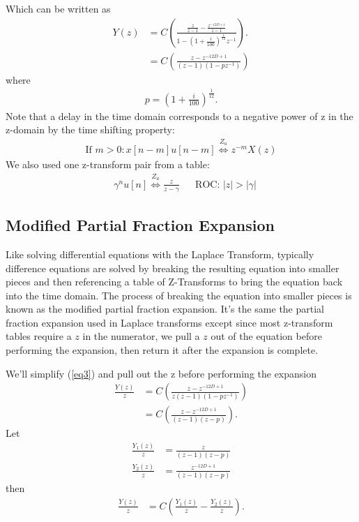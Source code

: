 \documentclass[letterpaper]{article}
\begin{document}
Which can be written as
\begin{align}
	Y(z) &=  C\left(\frac{\frac{z}{z-1} - \frac{z^{-12D+1}}{z-1}}
	{1 - \left(1 + \frac{i}{100} \right)^{\frac{1}{12}}z^{-1}}\right). \label{eq3} \\
	     &=  C\left(\frac{z - z^{-12D+1}}{(z-1)(1 - p z^{-1})}\right)
\end{align}
where 
\begin{align}
	p = \left(1 + \frac{i}{100} \right)^{\frac{1}{12}}.
\end{align}
Note that a delay in the time domain corresponds to a negative power of z in the z-domain by the time shifting property:
\begin{align}
	\text{If }m>0: x[n-m]u[n-m] \stackrel{Z_u}{\Longleftrightarrow} z^{-m} X(z)
\end{align}
We also used one z-transform pair from a table:
\begin{align}
	&\gamma^nu[n] \stackrel{Z_u}{\Longleftrightarrow} \frac{z}{z-\gamma} & &\text{ROC: } |z|>|\gamma| \label{tp1}
\end{align}

\subsection{Modified Partial Fraction Expansion}
Like solving differential equations with the Laplace Transform, typically difference equations are solved by breaking the resulting equation into smaller pieces and then referencing a table of Z-Transforms to bring the equation back into the time domain. The process of breaking the equation into smaller pieces is known as the modified partial fraction expansion. It's the same the partial fraction expansion used in Laplace transforms except since most z-transform tables require a $z$ in the numerator, we pull a $z$ out of the equation before performing the expansion, then return it after the expansion is complete.

We'll simplify (\ref{eq3}) and pull out the z before performing the expansion
\begin{align}
	\frac{Y(z)}{z} &= C \left( \frac{z - z^{-12D+1}}{z(z-1)(1 - pz^{-1})} \right) \\
	&= C \left( \frac{z - z^{-12D+1}}{(z-1)(z - p)} \right).
\end{align}
Let
\begin{align}
	\frac{Y_1(z)}{z} &= \frac{z}{(z-1)(z - p)} \\
	\frac{Y_2(z)}{z} &= \frac{z^{-12D+1}}{(z-1)(z - p)}
\end{align}
then
\begin{align}
	\frac{Y(z)}{z} &= C \left( \frac{Y_1(z)}{z} - \frac{Y_2(z)}{z} \right).
\end{align}
\end{document}

